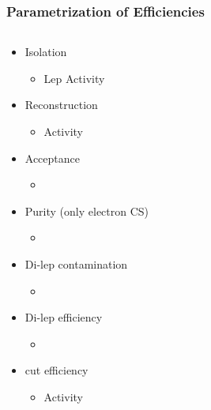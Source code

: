 \documentclass{beamer}
\begin{document}
\begin{frame}
\frametitle{Parametrization of Efficiencies}
  \begin{columns}
    \begin{column}{0.5\textwidth}
     \centering
     \deltaphi 
             \begin{itemize}


        \item Isolation
   \begin{itemize}
    \item Lep \pt Activity
   \end{itemize}
   \item Reconstruction
   \begin{itemize}
    \item Activity
   \end{itemize}
   \item Acceptance
   \begin{itemize}
    \item \BTags \NJets
   \end{itemize}
   \item Purity (only electron CS)
   \begin{itemize}
    \item \MHT \NJets
   \end{itemize}
      \item Di-lep contamination
   \begin{itemize}
    \item \NJets
   \end{itemize}
   \item Di-lep efficiency
   \begin{itemize}
    \item \NJets
   \end{itemize}
   \item \mt cut efficiency
   \begin{itemize}
    \item Activity
   \end{itemize}
     \end{itemize}
    \end{column}
    \begin{column}{0.5\textwidth}
      \centering
      \mindeltaphi
                   \begin{itemize}



\end{itemize}
\end{column}
\end{columns}
\end{frame}
\end{document}

